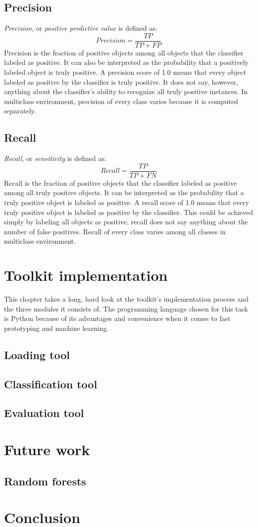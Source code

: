 \documentclass{article}
\begin{document}
    \subsection{Precision}
      {\it Precision}, or {\it positive predictive value} is defined as:
      \begin{displaymath}
        Precision = \frac{TP}{TP + FP}
      \end{displaymath}
      Precision is the fraction of positive objects among all objects that the classifier labeled as positive. It can also be interpreted as the probability that a positively labeled object is truly positive. A precision score of 1.0 means that every object labeled as positive by the classifier is truly positive. It does not say, however, anything about the classifier's ability to recognize all truly positive instances. In multiclass environment, precision of every class varies because it is computed separately.
    \subsection{Recall}
      {\it Recall}, or {\it sensitivity} is defined as:
      \begin{displaymath}
        Recall = \frac{TP}{TP + FN}
      \end{displaymath}
      Recall is the fraction of positive objects that the classifier labeled as positive among all truly positive objects. It can be interpreted as the probability that a truly positive object is labeled as positive. A recall score of 1.0 means that every truly positive object is labeled as positive by the classifier. This could be achieved simply by labeling all objects as positive, recall does not say anything about the number of false positives. Recall of every class varies among all classes in multiclass environment.
  \newpage
  \section{Toolkit implementation}
      This chapter takes a long, hard look at the toolkit's implementation process and the three modules it consists of. The programming language chosen for this task is Python because of its advantages and convenience when it comes to fast prototyping and machine learning.
    \subsection{Loading tool}
    \newpage
    \subsection{Classification tool}
    \newpage
    \subsection{Evaluation tool}
    \newpage
  \section{Future work}
    \subsection{Random forests}
    \newpage
  \section*{Conclusion}
\end{document}
